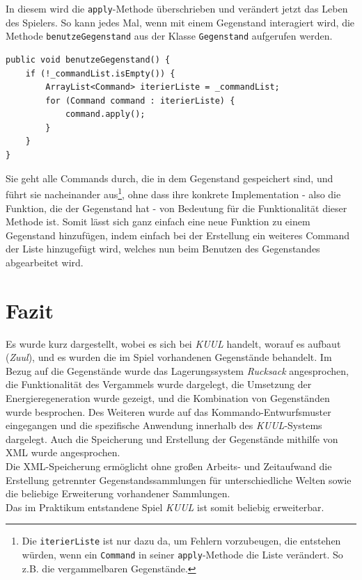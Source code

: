 \documentclass[12pt,twoside]{article}
\theoremstyle{plain}
\theoremstyle{definition}
\theoremstyle{remark}
\begin{document}
In diesem wird die \texttt{apply}-Methode überschrieben und verändert jetzt das Leben des Spielers.
So kann jedes Mal, wenn mit einem Gegenstand interagiert wird, die Methode \texttt{benutzeGegenstand} aus der Klasse \texttt{Gegenstand} aufgerufen werden.
\begin{lstlisting}[caption=die benutzeGegenstand-Methode aus der Klasse Gegenstand, label=code:main_gegenstand]
public void benutzeGegenstand() {
	if (!_commandList.isEmpty()) {
		ArrayList<Command> iterierListe = _commandList;
		for (Command command : iterierListe) {
			command.apply();
		}
	}
}
\end{lstlisting}
Sie geht alle Commands durch, die in dem Gegenstand gespeichert sind, und führt sie nacheinander aus\footnote{Die \texttt{iterierListe} ist nur dazu da, um Fehlern vorzubeugen, die entstehen würden, wenn ein \texttt{Command} in seiner \texttt{apply}-Methode die Liste verändert. So z.B. die vergammelbaren Gegenstände.}, ohne dass ihre konkrete Implementation - also die Funktion, die der Gegenstand hat - von Bedeutung für die Funktionalität dieser Methode ist. Somit lässt sich ganz einfach eine neue Funktion zu einem Gegenstand hinzufügen, indem einfach bei der Erstellung ein weiteres Command der Liste hinzugefügt wird, welches nun beim Benutzen des Gegenstandes abgearbeitet wird.

%

\section{Fazit}
\label{sec:end}
Es wurde kurz dargestellt, wobei es sich bei \textit{KUUL} handelt, worauf es aufbaut (\textit{Zuul}), und es wurden die im Spiel vorhandenen Gegenstände behandelt.
Im Bezug auf die Gegenstände wurde das Lagerungssystem \textit{Rucksack} angesprochen, die Funktionalität des Vergammels wurde dargelegt, die Umsetzung der Energieregeneration wurde gezeigt, und die Kombination von Gegenständen wurde besprochen.
Des Weiteren wurde auf das Kommando-Entwurfsmuster eingegangen und die spezifische Anwendung innerhalb des \textit{KUUL}-Systems dargelegt.
Auch die Speicherung und Erstellung der Gegenstände mithilfe von XML wurde angesprochen.\\
Die XML-Speicherung ermöglicht ohne großen Arbeits- und Zeitaufwand die Erstellung getrennter Gegenstandssammlungen für unterschiedliche Welten sowie die beliebige Erweiterung vorhandener Sammlungen.\\
Das im Praktikum entstandene Spiel \textit{KUUL} ist somit beliebig erweiterbar.
\end{document}
